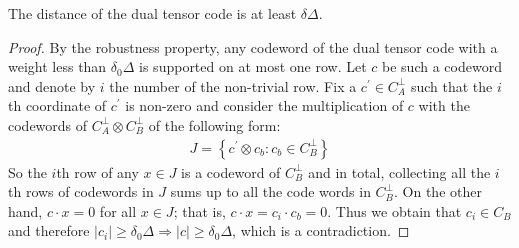 \begin{claim}
  The distance of the dual tensor code is at least $\delta\Delta$.
  \label{claim:duweight}
\end{claim}
\begin{proof}
By the robustness property, any codeword of the dual tensor code with a weight less than $\delta_{0}\Delta$ is supported on at most one row. Let $c$ be such a codeword and denote by $i$ the number of the non-trivial row. Fix a $c^{\prime} \in C_{A}^{\perp}$ such that the $i$th coordinate of  $c^{\prime}$ is non-zero and consider the multiplication of $c$ with the codewords of $C_{A}^\perp \otimes C_{B}^\perp$ of the following form:
  \begin{equation*}
    \begin{split}
      J = \left\{ c^{\prime} \otimes c_{b} : c_{b}\in C_{B}^{\perp} \right\} 
    \end{split}
  \end{equation*}
  So the $i$th row of any $x \in J$ is a codeword of $C_{B}^{\perp}$ and in total, collecting all the $i$th rows of codewords in $J$ sums up to all the code words in $C_{B}^{\perp}$. On the other hand, $c\cdot x = 0$ for all $x \in J$; that is, $c\cdot x = c_{i} \cdot c_{b} = 0$. Thus we obtain that $c_{i} \in C_{B}$ and therefore $|c_{i}| \ge \delta_{0}\Delta \Rightarrow |c| \ge \delta_{0}\Delta$, which is a contradiction.
\end{proof}

